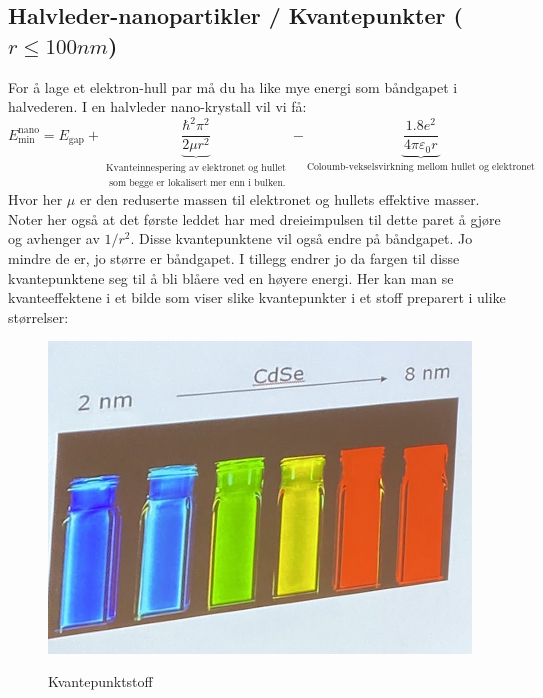 \documentclass{article}
\begin{document}
\subsection{Halvleder-nanopartikler / Kvantepunkter ($r \le 100nm$)}
For å lage et elektron-hull par må du ha like mye energi som båndgapet i halvederen. I en halvleder nano-krystall vil vi få:
\begin{equation}
  E^{\text{nano}}_{\text{min}} = E_{\text{gap}} + \underbrace{ \frac{\hbar^2 \pi^2}{2 \mu r^2}}_{\substack{\text{Kvanteinnespering av elektronet og hullet} \\ \text{ som begge er lokalisert mer enn i bulken.}}} - \underbrace{\frac{1.8 e^2}{4 \pi \varepsilon_0 r}}_{\text{Coloumb-vekselsvirkning mellom hullet og elektronet}}
\end{equation}
Hvor her $\mu$ er den reduserte massen til elektronet og hullets effektive masser. Noter her også at det første leddet har med dreieimpulsen til dette paret å gjøre og avhenger av $1/r^2$. Disse kvantepunktene vil også endre på båndgapet. Jo mindre de er, jo større er båndgapet. I tillegg endrer jo da fargen til disse kvantepunktene seg til å bli blåere ved en høyere energi. Her kan man se kvanteeffektene i et bilde som viser slike kvantepunkter i et stoff preparert i ulike størrelser:
\begin{figure}[h]
  \centering
  \caption{Kvantepunktstoff}
  \includegraphics[scale=0.4]{bilder/kvantepunktstoff.jpg}
  \label{fig:kvantepunktstoff}
\end{figure}
\end{document}
